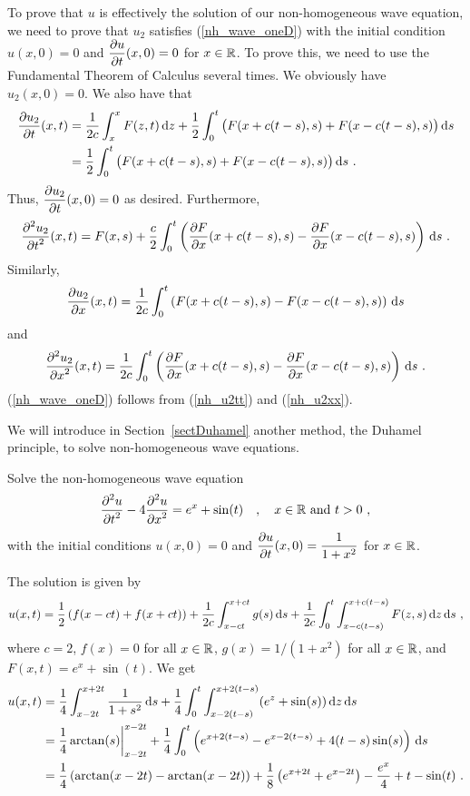 To prove that $u$ is effectively the solution of our non-homogeneous
wave equation, we need to prove that $u_2$ satisfies
(\ref{nh_wave_oneD}) with the initial condition
$\displaystyle u(x,0)= 0$ and $\displaystyle \frac{\partial{u}}{\partial t}(x,0) = 0$
for $x \in \mathbb{R}$.  To prove this, we need to use the Fundamental
Theorem of Calculus several times.  We obviously have $u_2(x,0) =0$.
We also have that
\begin{align*}
\frac{\partial{u_2}}{\partial t}(x,t) &= \frac{1}{2c} \int_{x}^{x} F(z,t)\,\mathrm{d}{z}
+ \frac{1}{2} \int_0^t \big( F(x+c(t-s),s) + F(x-c(t-s),s) \big)
\,\mathrm{d}{s} \\
&= \frac{1}{2} \int_0^t \big( F(x+c(t-s),s) + F(x-c(t-s),s) \big) \,\mathrm{d}{s} \ .
\end{align*}
Thus, $\displaystyle \frac{\partial{u_2}}{\partial t}(x,0) = 0$ as desired.
Furthermore,
\begin{equation} \label{nh_u2tt}
\frac{\displaystyle \partial^{2}{u_2}} {\displaystyle \partial t^{2}}(x,t) = F(x,s)
+ \frac{c}{2} \int_0^t \left( \frac{\partial{F}}{\partial x}(x+c(t-s),s)
- \frac{\partial{F}}{\partial x}(x-c(t-s),s) \right) \,\mathrm{d}{s} \ .
\end{equation}
Similarly,
\[
\frac{\partial{u_2}}{\partial x}(x,t) = \frac{1}{2c} \int_0^t
\left( F(x+c(t-s),s) - F(x-c(t-s),s) \right) \,\mathrm{d}{s}
\]
and
\begin{equation} \label{nh_u2xx}
\frac{\displaystyle \partial^{2}{u_2}} {\displaystyle \partial x^{2}}(x,t) = 
\frac{1}{2c} \int_0^t \left( \frac{\partial{F}}{\partial x}(x+c(t-s),s)
- \frac{\partial{F}}{\partial x}(x-c(t-s),s) \right) \,\mathrm{d}{s} \ .
\end{equation}
(\ref{nh_wave_oneD}) follows from (\ref{nh_u2tt}) and (\ref{nh_u2xx}).

\begin{rmk}
We will introduce in Section~\ref{sectDuhamel} another method, the
Duhamel principle, to solve non-homogeneous wave equations.
\end{rmk}

\begin{egg}
Solve the non-homogeneous wave equation
\[
\frac{\displaystyle \partial^{2}{u}} {\displaystyle \partial t^{2}} - 4 \frac{\displaystyle \partial^{2}{u}} {\displaystyle \partial x^{2}} = e^x + \sin(t) \quad , \quad
x\in \mathbb{R}\ \text{and} \ t>0 \ ,
\]
with the initial conditions
$\displaystyle u(x,0) = 0$ and
$\displaystyle \frac{\partial{u}}{\partial t}(x,0) = \frac{1}{1+x^2}$ for $x \in \mathbb{R}$.

The solution is given by
\[
u(x,t) = \frac{1}{2} \left(f(x-ct) + f(x+ct)\right)
+ \frac{1}{2c} \int_{x-ct}^{x+ct} g(s)\dx{s} 
+ \frac{1}{2c} \int_0^t \int_{x-c(t-s)}^{x+c(t-s)} F(z,s)\dx{z}\dx{s} \ ,
\]
where $c=2$, $f(x)=0$ for all $x \in \mathbb{R}$,
$\displaystyle g(x) = 1/(1+x^2)$ for all
$x\in \mathbb{R}$, and $\displaystyle F(x,t) = e^x + \sin(t)$.  We get
\begin{align*}
u(x,t) &= \frac{1}{4} \int_{x-2t}^{x+2t} \frac{1}{1+s^2} \,\mathrm{d}{s} 
+ \frac{1}{4} \int_0^t \int_{x-2(t-s)}^{x+2(t-s)} (e^z + \sin(s))
\,\mathrm{d}{z}\,\mathrm{d}{s} \\
&= \frac{1}{4} \arctan(s) \bigg|_{x-2t}^{x-2t}
+ \frac{1}{4} \int_0^t \left(e^{x+2(t-s)} - e^{x-2(t-s)} +
  4(t-s)\sin(s) \right) \,\mathrm{d}{s} \\
&= \frac{1}{4} \left( \arctan(x-2t) - \arctan(x-2t) \right)
+ \frac{1}{8} \left( e^{x+2t} + e^{x-2t} \right) - \frac{e^x}{4}
+ t - \sin(t) \ .
\end{align*}
\end{egg}


